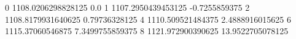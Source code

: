 0 1108.0206298828125 0.0
1 1107.2950439453125 -0.7255859375
2 1108.8179931640625 0.79736328125
4 1110.509521484375 2.4888916015625
6 1115.37060546875 7.3499755859375
8 1121.972900390625 13.9522705078125
